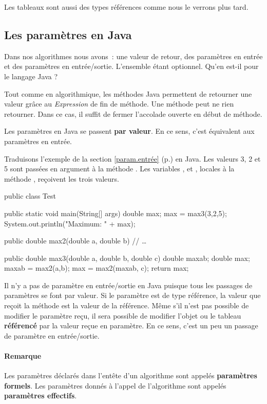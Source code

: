 	Les tableaux sont aussi des types références comme nous le verrons plus tard.
	
	
	
	\subsection{Les paramètres en Java}

	Dans nos algorithmes nous avons~: une valeur de retour, des paramètres en
	entrée et des paramètres en entrée/sortie. L'ensemble étant optionnel. Qu'en
	est-il pour le langage Java ? 

	Tout comme en algorithmique, les méthodes Java permettent de retourner une
	valeur grâce au  \textit{Expression} de fin de méthode. Une
	méthode peut ne rien retourner. Dans ce cas, il suffit de fermer l'accolade
	ouverte en début de méthode.

	Les paramètres en Java se passent \textbf{par valeur}. En ce sens, c'est
	équivalent aux paramètres en entrée. 

	Traduisons l'exemple de la section \ref{param.entrée}
	(p.\pageref{param.entrée}) en Java. Les valeurs 3, 2 et 5 sont passées en
	argument à la méthode . Les variables ,  et ,
	locales à la méthode , reçoivent les trois valeurs. 

	\begin{java}
public class Test{
	public static void main(String[] args){
		double max;
		max = max3(3,2,5);
		System.out.println("Maximum: " + max);
	}

	public double max2(double a, double b){
		// …
	}

	public double max3(double a, double b, double c){
		double maxab;
		double max;
		maxab = max2(a,b);
		max = max2(maxab, c);
		return max;
	}
}
	\end{java}

	Il n'y a pas de paramètre en entrée/sortie en Java puisque tous les passages
	de paramètres se font par valeur. Si le paramètre est de type référence, la
	valeur que reçoit la méthode est la valeur de la référence. Même s'il n'est
	pas possible de modifier le paramètre reçu, il sera possible de modifier
	l'objet ou le tableau \textbf{référencé} par la valeur reçue en paramètre.
	En ce sens, c'est un peu un passage de paramètre en entrée/sortie. 

	
	\paragraph{Remarque}
	Les paramètres déclarés dans l’entête d’un algorithme sont appelés
	\textbf{paramètres formels}.  Les paramètres donnés à l’appel de
	l’algorithme sont appelés \textbf{paramètres effectifs}. 
	
	

